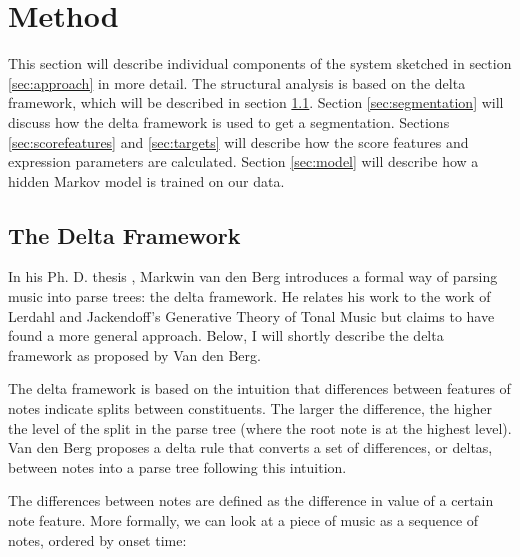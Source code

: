 \documentclass[a4paper,10pt]{article}
\begin{document}

\section{Method}
\label{sec:method}

This section will describe individual components of the system sketched in section \ref{sec:approach} in more detail. The structural analysis is based on the delta framework, which will be described in section \ref{sec:deltaframework}.  Section \ref{sec:segmentation} will discuss how the delta framework is used to get a segmentation. Sections \ref{sec:scorefeatures} and \ref{sec:targets} will describe how the score features and expression parameters are calculated. Section \ref{sec:model} will describe how a hidden Markov model is trained on our data.

\subsection{The Delta Framework}
\label{sec:deltaframework}

In his Ph. D. thesis \cite{markwin}, Markwin van den Berg introduces a formal way of parsing music into parse trees: the delta framework. He relates his work to the work of Lerdahl and Jackendoff's Generative Theory of Tonal Music \cite{lerdahl1996generative} but claims to have found a more general approach. Below, I will shortly describe the delta framework as proposed by Van den Berg.

The delta framework is based on the intuition that differences between features of notes indicate splits between constituents. The larger the difference, the higher the level of the split in the parse tree (where the root note is at the highest level). Van den Berg proposes a delta rule that converts a set of differences, or deltas, between notes into a parse tree following this intuition. 

The differences between notes are defined as the difference in value of a certain note feature. More formally, we can look at a piece of music as a sequence of notes, ordered by onset time:
\end{document}
